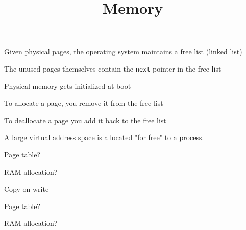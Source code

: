 

\title{Memory}

\usetikzlibrary{intersections} %




\begin{frame}
    \titlepage
\end{frame}

\begin{slide}


    Given physical pages, the operating system maintains a free list (linked
    list)
    \medskip

    The unused pages themselves contain the \texttt{next} pointer in the free list

    \leftspace{}Physical memory gets initialized at boot
    \medskip

    To allocate a page, you remove it from the free list

    \leftspace{}To deallocate a page you add it back to the free list

\end{slide}

\begin{slide}

	
	A large virtual address space is allocated "for free" to a process.
	
	\vspace{5mm}
	
	Page table?
	
	\vspace{5mm}
	
	RAM allocation?
	
\end{slide}

\begin{slide}

	
	Copy-on-write
	
	\vspace{5mm}
	
	Page table?
	
	\vspace{5mm}
	
	RAM allocation?
	
\end{slide}

